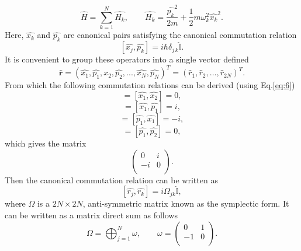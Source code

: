\documentclass[11pt,a4paper]{article}
\numberwithin{equation}{section}
\begin{document}
	\begin{equation} \label{eq:8}
	\hat{H} = \sum_{k=1}^{N}\hat{H_k},\qquad\hat{H_k} =\frac{\hat{p_k}^2}{2m} + \frac{1}{2} m\omega_{k}^2\hat{x_k}^2.
	\end{equation}
	Here, $\hat{x_k}$ and $\hat{p_k}$ are canonical pairs satisfying the canonical commutation relation 
	\begin{equation} \label{eq:9}
	[\hat{x_j}, \hat{p_k}] = i\hbar \delta_{j\,k}\hat{\mathbb{I}} .
	\end{equation}
	It is convenient to group these operators into a single vector defined
	\begin{equation} \label{eq:10}
	\mathbf{\hat{r}} = (\hat{x_1},\hat{p_1},\hat{x_2},\hat{p_2},...,\hat{x_N},\hat{p_N})^T = (\hat{r}_1, \hat{r}_2, ..., \hat{r}_{2N})^T .
	\end{equation}
	From which the following commutation relations can be derived (using Eq.\ref{eq:6})
	\begin{equation*}
	[\hat{r}_1, \hat{r}_1] = [\hat{x_1}, \hat{x_2}] = 0,
	\end{equation*} 
	\begin{equation*}
	[\hat{r}_1, \hat{r}_2] = [\hat{x_1}, \hat{p_1}] = i,
	\end{equation*} 
	\begin{equation*}
	[\hat{r}_2, \hat{r}_1] = [\hat{p_1}, \hat{x_1}] = -i,
	\end{equation*} 
	\begin{equation*}
	[\hat{r}_2, \hat{r}_2] = [\hat{p_1}, \hat{p_2}] = 0,
	\end{equation*}
	which gives the matrix 
	\begin{equation*}
	\begin{pmatrix}
	0 & i  \\
	-i & 0 \\
	\end{pmatrix}.
	\end{equation*}
	Then the canonical commutation relation can be written as
	\begin{equation} \label{eq:11}
	[\hat{r_j}, \hat{r_k}] = i\Omega_{jk}\mathbb{\hat{I}},
	\end{equation}
	where $\Omega$ is a $2N \times 2N$, anti-symmetric matrix known as the symplectic form. It can be written as a matrix direct sum as follows
	\begin{equation} \label{eq:12}
	\Omega = \bigoplus_{j=1}^{N}\omega, \qquad\omega = 
	\begin{pmatrix}
	0 & 1  \\
	-1 & 0 \\
	\end{pmatrix}.
	\end{equation}
	
\end{document}
